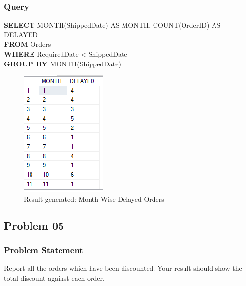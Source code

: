\documentclass[12pt,a4paper]{report}
\begin{document}
\subsubsection{Query}
\begin{center}
	\begin{minipage}{12cm}
		\textbf{SELECT} MONTH(ShippedDate) AS MONTH, COUNT(OrderID) AS DELAYED\\
		\textbf{FROM} Orders\\
		\textbf{WHERE} RequiredDate < ShippedDate\\
		\textbf{GROUP BY} MONTH(ShippedDate)
	\end{minipage}
	\begin{figure}[h]
	\centering
		\includegraphics[scale=0.7]{images/9.png}
		\caption{Result generated: Month Wise Delayed Orders}
	\end{figure}
\end{center}

\subsection{Problem 05}
\subsubsection{Problem Statement}
Report all the orders which have been discounted. Your result should show the total discount against each 
order.
\end{document}
